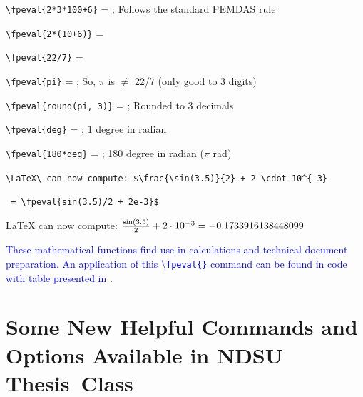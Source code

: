 \documentclass[phd]{ndsu-thesis-2022}
\newcommand\italk[1]{\textcolor{blue}{#1}}  %
\newcommand\cmd[1]{\textbackslash\texttt{#1}}  %
\newcommand\lx{\LaTeX\xspace}
\begin{document}
\verb|\fpeval{2*3*100+6}| = ; \hspace{0.15in} Follows the standard PEMDAS rule

\verb|\fpeval{2*(10+6)}| = 
   
\verb|\fpeval{22/7}| = 

\verb|\fpeval{pi}| = ; \hspace{0.15in} So, $\pi$ is $\neq$ 22/7 (only good to 3 digits)

\verb|\fpeval{round(pi, 3)}| = ; \hspace{0.15in} Rounded to 3 decimals

\verb+\fpeval{deg}+ = ; \hspace{0.15in} 1 degree in radian

\verb+\fpeval{180*deg}+ = ; \hspace{0.15in} 180 degree in radian ($\pi$ rad)

\verb|\LaTeX\ can now compute: $\frac{\sin(3.5)}{2} + 2 \cdot 10^{-3}| 

\verb| = \fpeval{sin(3.5)/2 + 2e-3}$|

\lx can now compute: $\frac{\sin(3.5)}{2} + 2 \cdot 10^{-3} = \fpeval{sin(3.5)/2 + 2e-3}$

\italk{These mathematical functions find use in calculations and technical document preparation. An application of this \cmd{fpeval\{\}} command can be found in \Cref{tab210} code with table presented in \cpageref{tab210}}. 

\section{Some New Helpful Commands and Options Available in NDSU Thesis~Class}
\end{document}
